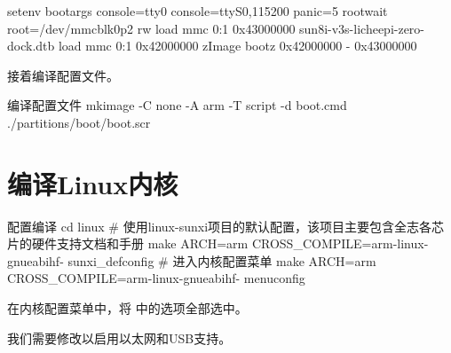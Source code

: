 \documentclass[lang=cn,newtx,10pt,scheme=chinese]{elegantbook}
\begin{document}
\begin{mycode}
setenv bootargs console=tty0 console=ttyS0,115200 panic=5 rootwait root=/dev/mmcblk0p2 rw
load mmc 0:1 0x43000000 sun8i-v3s-licheepi-zero-dock.dtb
load mmc 0:1 0x42000000 zImage
bootz 0x42000000 - 0x43000000
\end{mycode}

接着编译配置文件。

\begin{mycode}{编译配置文件}
mkimage -C none -A arm -T script -d boot.cmd ./partitions/boot/boot.scr
\end{mycode}

\section{编译Linux内核}

\begin{mycode}{配置编译}
cd linux
# 使用linux-sunxi项目的默认配置，该项目主要包含全志各芯片的硬件支持文档和手册
make ARCH=arm CROSS_COMPILE=arm-linux-gnueabihf- sunxi_defconfig
# 进入内核配置菜单
make ARCH=arm CROSS_COMPILE=arm-linux-gnueabihf- menuconfig
\end{mycode}

\begin{marker}
    在内核配置菜单中，将  中的选项全部选中。
\end{marker}

我们需要修改以启用以太网和USB支持。
\end{document}
